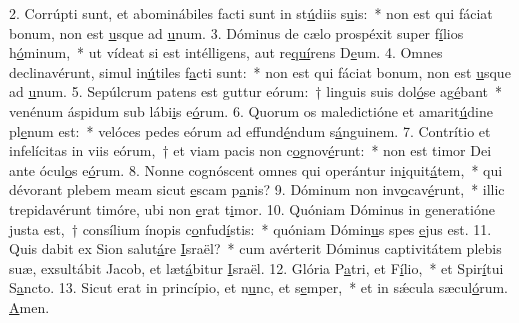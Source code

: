 2. Corrúpti sunt, et abominábiles facti sunt in st\uline{ú}diis s\uline{u}is:~* non est qui fáciat bonum, non est \uline{u}sque ad \uline{u}num.
3. Dóminus de cælo prospéxit super f\uline{í}lios h\uline{ó}minum,~* ut vídeat si est intélligens, aut re\uline{quí}rens D\uline{e}um.
4. Omnes declinavérunt, simul in\uline{ú}tiles f\uline{a}cti sunt:~* non est qui fáciat bonum, non est \uline{u}sque ad \uline{u}num.
5. Sepúlcrum patens est guttur eórum:~† linguis suis dol\uline{ó}se ag\uline{é}bant~* venénum áspidum sub lábi\uline{i}s e\uline{ó}rum.
6. Quorum os maledictióne et amarit\uline{ú}dine pl\uline{e}num est:~* velóces pedes eórum ad effund\uline{é}ndum s\uline{á}nguinem.
7. Contrítio et infelícitas in viis eórum,~† et viam pacis non c\uline{o}gnov\uline{é}runt:~* non est timor Dei ante ócul\uline{o}s e\uline{ó}rum.
8. Nonne cognóscent omnes qui operántur in\uline{i}quit\uline{á}tem,~* qui dévorant plebem meam sicut \uline{e}scam p\uline{a}nis?
9. Dóminum non inv\uline{o}cav\uline{é}runt,~* illic trepidavérunt timóre, ubi non \uline{e}rat t\uline{i}mor.
10. Quóniam Dóminus in generatióne justa est,~† consílium ínopis c\uline{o}nfud\uline{í}stis:~* quóniam Dómin\uline{u}s spes \uline{e}jus est.
11. Quis dabit ex Sion salut\uline{á}re \uline{I}sraël?~* cum avérterit Dóminus captivitátem plebis suæ, exsultábit Jacob, et læt\uline{á}bitur \uline{I}sraël.
12. Glória P\uline{a}tri, et F\uline{í}lio,~* et Spir\uline{í}tui S\uline{a}ncto.
13. Sicut erat in princípio, et n\uline{u}nc, et s\uline{e}mper,~* et in sǽcula sæcul\uline{ó}rum. \uline{A}men.
